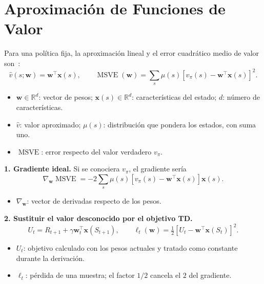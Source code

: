 \section{Aproximación de Funciones de Valor}
Para una política fija, la aproximación lineal y el error cuadrático medio de valor son~\cite[secc.~9.3]{sutton}:
\begin{equation}\label{eq:msve}
    \hat v(s;\mathbf{w})=\mathbf{w}^{\top}\mathbf{x}(s),\qquad
    \operatorname{MSVE}(\mathbf{w})=
    \sum_s\mu(s)[v_\pi(s)-\mathbf{w}^{\top}\mathbf{x}(s)]^2.
\end{equation}
\begin{itemize}
    \item $\mathbf{w}\in\mathbb{R}^d$: vector de pesos; $\mathbf{x}(s)\in\mathbb{R}^d$: características del estado; $d$: número de características.
    \item $\hat v$: valor aproximado; $\mu(s)$: distribución que pondera los estados, con suma uno.
    \item $\operatorname{MSVE}$: error respecto del valor verdadero $v_\pi$.
\end{itemize}

\textbf{1. Gradiente ideal.} Si se conociera $v_\pi$, el gradiente sería
\begin{equation}\label{eq:msve-gradient}
    \nabla_{\mathbf{w}}\operatorname{MSVE}
    =-2\sum_s\mu(s)[v_\pi(s)-\mathbf{w}^{\top}\mathbf{x}(s)]\mathbf{x}(s).
\end{equation}
\begin{itemize}
    \item $\nabla_{\mathbf{w}}$: vector de derivadas respecto de los pesos.
\end{itemize}

\textbf{2. Sustituir el valor desconocido por el objetivo TD.}
\begin{equation}\label{eq:td-target-linear}
    U_t=R_{t+1}+\gamma\mathbf{w}_t^{\top}\mathbf{x}(S_{t+1}),\qquad
    \ell_t(\mathbf{w})=\tfrac12[U_t-\mathbf{w}^{\top}\mathbf{x}(S_t)]^2.
\end{equation}
\begin{itemize}
    \item $U_t$: objetivo calculado con los pesos actuales y tratado como constante durante la derivación.
    \item $\ell_t$: pérdida de una muestra; el factor $1/2$ cancela el $2$ del gradiente.
\end{itemize}

